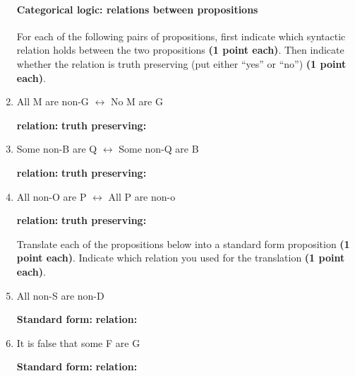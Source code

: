 \documentclass[10pt]{article}
\begin{document}
\begin{enumerate}
\vspace{1cm}

\paragraph{Categorical logic: relations between propositions}

For each of the following pairs of propositions, first indicate which syntactic relation holds between the two propositions \textbf{(1 point each)}. Then indicate whether the relation is truth preserving (put either ``yes'' or ``no'') \textbf{(1 point each)}.

  \item All M are non-G $\longleftrightarrow$ No M are G 
  
  \textbf{relation:}\underline{\hspace{2in}} \textbf{truth preserving:}\underline{\hspace{2in}}
  
  \item Some non-B are Q $\longleftrightarrow$ Some non-Q are B 
  
  \textbf{relation:}\underline{\hspace{2in}} \textbf{truth preserving:}\underline{\hspace{2in}}
  
  \item All non-O are P $\longleftrightarrow$ All P are non-o
  
  \textbf{relation:}\underline{\hspace{2in}} \textbf{truth preserving:}\underline{\hspace{2in}}

\newpage

Translate each of the propositions below into a standard form proposition \textbf{(1 point each)}.  Indicate which relation you used for the translation \textbf{(1 point each)}.

  \item All non-S are non-D 
  
  \textbf{Standard form:}\underline{\hspace{2in}} \textbf{relation:}\underline{\hspace{2in}}
  
  \item It is false that some F are G 
  
  \textbf{Standard form:}\underline{\hspace{2in}} \textbf{relation:}\underline{\hspace{2in}}
  

\end{enumerate}
\end{document}
